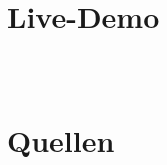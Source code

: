 %
%

%
%

\begin{frame}
    \frametitle{\ }
    \centering
    \vspace*{-14pt}
    \Huge\insertsection
\end{frame}

\section{Live-Demo}
\begin{frame}
    \frametitle{~}
    \centering
    \vspace*{-14pt}
    \Huge\insertsection
\end{frame}

\section{Quellen}
\begin{frame}[allowframebreaks]{\insertsection} %
\printbibliography
\end{frame}

